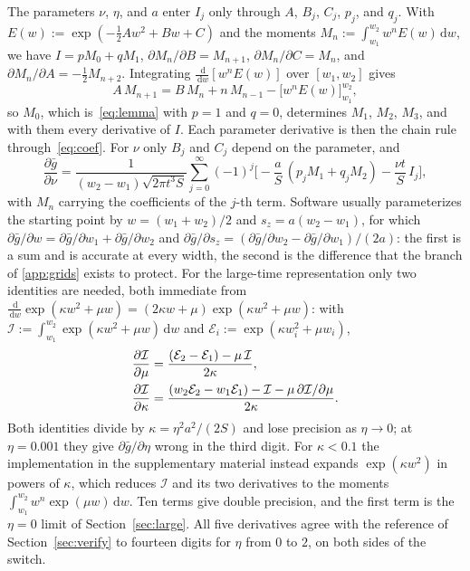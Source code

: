 \documentclass[final,5p,times,twocolumn,authoryear]{elsarticle}
\newcommand{\ddx}[2]{\frac{\partial #1}{\partial #2}}
\newcommand{\dd}{\,\mathrm{d}}
\newcommand{\gbar}{\bar{g}}
\begin{document}
The parameters $\nu$, $\eta$, and $a$ enter $I_j$ only through $A$, $B_j$, $C_j$, $p_j$, and $q_j$. With $E(w) := \exp(-\tfrac12 Aw^2 + Bw + C)$ and the moments $M_n := \int_{w_1}^{w_2} w^n E(w)\dd w$, we have $I = pM_0 + qM_1$, $\partial M_n/\partial B = M_{n+1}$, $\partial M_n/\partial C = M_n$, and $\partial M_n/\partial A = -\tfrac12 M_{n+2}$. Integrating $\frac{\dd}{\dd w}[w^n E(w)]$ over $[w_1, w_2]$ gives
\begin{equation}
A\,M_{n+1} = B\,M_n + n\,M_{n-1} - \big[w^n E(w)\big]_{w_1}^{w_2},
\label{eq:dI}
\end{equation}
so $M_0$, which is~\eqref{eq:lemma} with $p = 1$ and $q = 0$, determines $M_1$, $M_2$, $M_3$, and with them every derivative of $I$. Each parameter derivative is then the chain rule through~\eqref{eq:coef}. For $\nu$ only $B_j$ and $C_j$ depend on the parameter, and
\begin{equation*}
\ddx{\gbar}{\nu} = \frac{1}{(w_2 - w_1)\sqrt{2\pi t^3 S}}\sum_{j=0}^{\infty}(-1)^j \Big[-\frac{a}{S}\,(p_jM_1 + q_jM_2) - \frac{\nu t}{S}\,I_j\Big],
\end{equation*}
with $M_n$ carrying the coefficients of the $j$-th term. Software usually parameterizes the starting point by $w = (w_1+w_2)/2$ and $s_z = a(w_2-w_1)$, for which $\partial\gbar/\partial w = \partial\gbar/\partial w_1 + \partial\gbar/\partial w_2$ and $\partial\gbar/\partial s_z = (\partial\gbar/\partial w_2 - \partial\gbar/\partial w_1)/(2a)$: the first is a sum and is accurate at every width, the second is the difference that the branch of \ref{app:grids} exists to protect. For the large-time representation only two identities are needed, both immediate from $\frac{\dd}{\dd w}\exp(\kappa w^2+\mu w) = (2\kappa w + \mu)\exp(\kappa w^2+\mu w)$: with $\mathcal I := \int_{w_1}^{w_2}\exp(\kappa w^2+\mu w)\dd w$ and $\mathcal E_i := \exp(\kappa w_i^2 + \mu w_i)$,
\begin{align}
\ddx{\mathcal I}{\mu} &= \frac{(\mathcal E_2 - \mathcal E_1) - \mu\,\mathcal I}{2\kappa}, \notag\\
\ddx{\mathcal I}{\kappa} &= \frac{(w_2\mathcal E_2 - w_1\mathcal E_1) - \mathcal I - \mu\,\partial\mathcal I/\partial\mu}{2\kappa}.
\label{eq:dlarge}
\end{align}
Both identities divide by $\kappa = \eta^2 a^2/(2S)$ and lose precision as $\eta \to 0$; at $\eta = 0.001$ they give $\partial\gbar/\partial\eta$ wrong in the third digit. For $\kappa < 0.1$ the implementation in the supplementary material instead expands $\exp(\kappa w^2)$ in powers of $\kappa$, which reduces $\mathcal I$ and its two derivatives to the moments $\int_{w_1}^{w_2} w^n \exp(\mu w)\dd w$. Ten terms give double precision, and the first term is the $\eta = 0$ limit of Section~\ref{sec:large}. All five derivatives agree with the reference of Section~\ref{sec:verify} to fourteen digits for $\eta$ from $0$ to $2$, on both sides of the switch.
\end{document}
